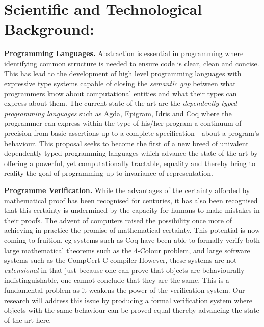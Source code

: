 \documentclass[a4paper,11pt]{article}
\begin{document}


\section{Scientific and Technological Background:}

{\bf Programming Languages.} Abstraction is essential in programming
where identifying common structure is needed to ensure code is clear,
clean and concise. This has lead to the development of high level
programming languages with expressive type systems capable of closing
the {\em semantic gap} between what programmers know about
computational entities and what their types can express about them.
The current state of the art are the {\em dependently typed
  programming languages} such as Agda, Epigram, Idris and Coq where
the programmer can express within the type of his/her program a
continuum of precision from basic assertions up to a complete
specification - about a program’s behaviour. This proposal seeks to
become the first of a new breed of univalent dependently typed
programming languages which advance the state of the art by offering a
powerful, yet computationally tractable, equality and thereby bring to
reality the goal of programming up to invariance of representation.


{\bf Programme Verification.} While the advantages of the certainty
afforded by mathematical proof has been recognised for centuries, it
has also been recognised that this certainty is undermined by the
capacity for humans to make mistakes in their proofs. The advent of
computers raised the possibility once more of achieving in practice
the promise of mathematical certainty. This potential is now coming to
fruition, eg systems such as Coq have been able to formally verify
both large mathematical theorems such as the 4-Colour problem, and
large software systems such as the CompCert C-compiler
However, these systems
are not {\em extensional} in that just because one can prove that
objects are behaviourally indistinguishable, one cannot conclude that
they are the same. This is a fundamental problem as it weakens the
power of the verification system. Our research will address this
issue by producing a formal verification system where objects with the
same behaviour can be proved equal thereby advancing the state of the
art here.
\end{document}
